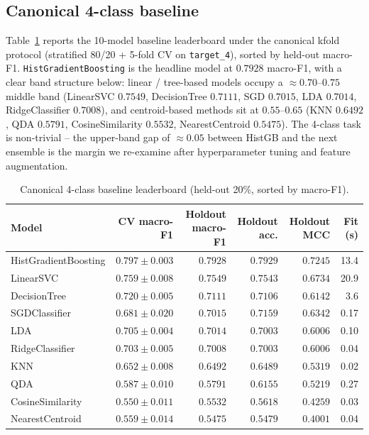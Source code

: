 \documentclass[11pt,a4paper]{article}
\begin{document}
\subsection{Canonical 4-class baseline}
\label{sec:canonical-4class}

Table~\ref{tab:canonical-4class} reports the 10-model baseline leaderboard
under the canonical kfold protocol (stratified 80/20 + 5-fold CV on
\texttt{target\_4}), sorted by held-out macro-F1. \texttt{HistGradientBoosting}
is the headline model at $0.7928$ macro-F1, with a clear band structure below:
linear / tree-based models occupy a $\approx 0.70$--$0.75$ middle band
(LinearSVC $0.7549$, DecisionTree $0.7111$, SGD $0.7015$, LDA $0.7014$,
RidgeClassifier $0.7008$), and centroid-based methods sit
at $0.55$--$0.65$ (KNN $0.6492$, QDA $0.5791$, CosineSimilarity $0.5532$,
NearestCentroid $0.5475$). The 4-class task is non-trivial -- the
upper-band gap of $\approx 0.05$ between HistGB and the next ensemble is the
margin we re-examine after hyperparameter tuning and feature augmentation.

\begin{table}[H]
\centering
\caption{Canonical 4-class baseline leaderboard (held-out 20\%, sorted by macro-F1).}
\label{tab:canonical-4class}
\small
\begin{tabular}{lrrrrr}
\toprule
Model & CV macro-F1 & Holdout macro-F1 & Holdout acc. & Holdout MCC & Fit (s) \\
\midrule
HistGradientBoosting & $0.797\pm0.003$ & $0.7928$ & $0.7929$ & $0.7245$ & 13.4 \\
LinearSVC & $0.759\pm0.008$ & $0.7549$ & $0.7543$ & $0.6734$ & 20.9 \\
DecisionTree & $0.720\pm0.005$ & $0.7111$ & $0.7106$ & $0.6142$ & 3.6 \\
SGDClassifier & $0.681\pm0.020$ & $0.7015$ & $0.7159$ & $0.6342$ & 0.17 \\
LDA & $0.705\pm0.004$ & $0.7014$ & $0.7003$ & $0.6006$ & 0.10 \\
RidgeClassifier & $0.703\pm0.005$ & $0.7008$ & $0.7003$ & $0.6006$ & 0.04 \\
KNN & $0.652\pm0.008$ & $0.6492$ & $0.6489$ & $0.5319$ & 0.02 \\
QDA & $0.587\pm0.010$ & $0.5791$ & $0.6155$ & $0.5219$ & 0.27 \\
CosineSimilarity & $0.550\pm0.011$ & $0.5532$ & $0.5618$ & $0.4259$ & 0.03 \\
NearestCentroid & $0.559\pm0.014$ & $0.5475$ & $0.5479$ & $0.4001$ & 0.04 \\
\bottomrule
\end{tabular}
\end{table}
\end{document}
